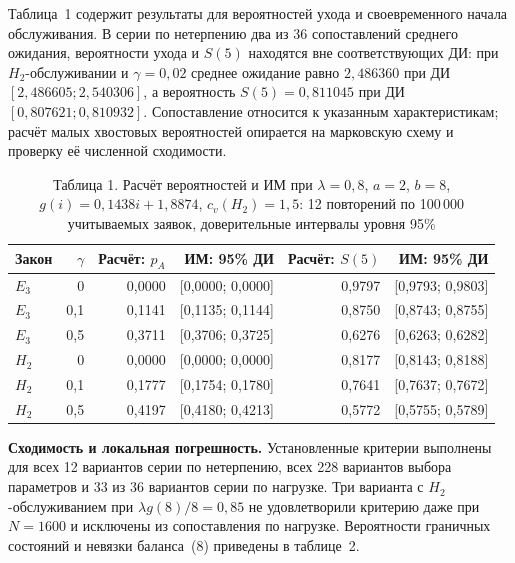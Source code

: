 Таблица~1 содержит результаты для вероятностей ухода и своевременного начала обслуживания. В серии по нетерпению два из 36 сопоставлений среднего ожидания, вероятности ухода и $S(5)$ находятся вне соответствующих ДИ: при $H_2$-обслуживании и $\gamma=0{,}02$ среднее ожидание равно $2{,}486360$ при ДИ $[2{,}486605;2{,}540306]$, а вероятность $S(5)=0{,}811045$ при ДИ $[0{,}807621;0{,}810932]$. Сопоставление относится к указанным характеристикам; расчёт малых хвостовых вероятностей опирается на марковскую схему и проверку её численной сходимости.

\begin{table}[htbp]\centering\small
\caption{Таблица 1. Расчёт вероятностей и ИМ при $\lambda=0{,}8$, $a=2$, $b=8$, $g(i)=0{,}1438i+1{,}8874$, $c_v(H_2)=1{,}5$: 12 повторений по 100\,000 учитываемых заявок, доверительные интервалы уровня 95\%}
\begin{tabular}{lrrrrr}
\hline
Закон & $\gamma$ & Расчёт: $p_A$ & ИМ: 95\% ДИ & Расчёт: $S(5)$ & ИМ: 95\% ДИ \\
\hline
$E_3$ & 0 & 0,0000 & [0,0000; 0,0000] & 0,9797 & [0,9793; 0,9803] \\
$E_3$ & 0,1 & 0,1141 & [0,1135; 0,1144] & 0,8750 & [0,8743; 0,8755] \\
$E_3$ & 0,5 & 0,3711 & [0,3706; 0,3725] & 0,6276 & [0,6263; 0,6282] \\
$H_2$ & 0 & 0,0000 & [0,0000; 0,0000] & 0,8177 & [0,8143; 0,8188] \\
$H_2$ & 0,1 & 0,1777 & [0,1754; 0,1780] & 0,7641 & [0,7637; 0,7672] \\
$H_2$ & 0,5 & 0,4197 & [0,4180; 0,4213] & 0,5772 & [0,5755; 0,5789] \\
\hline
\end{tabular}

\end{table}

\noindent\textbf{Сходимость и локальная погрешность.}
Установленные критерии выполнены для всех 12 вариантов серии по нетерпению, всех 228 вариантов выбора параметров и 33 из 36 вариантов серии по нагрузке. Три варианта с $H_2$-обслуживанием при $\lambda g(8)/8=0{,}85$ не удовлетворили критерию даже при $N=1600$ и исключены из сопоставления по нагрузке. Вероятности граничных состояний и невязки баланса~(8) приведены в таблице~2.

